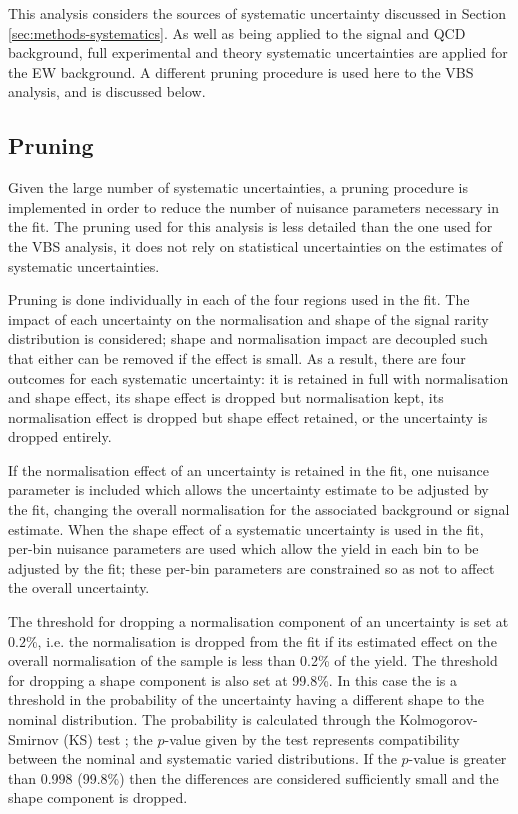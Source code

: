 

This analysis considers the sources of systematic uncertainty discussed in
Section \ref{sec:methods-systematics}. As well as being applied to the signal
and \ac{QCD} \Zy background, full experimental and theory systematic
uncertainties are applied for the \ac{EW} \Zyjj background. A different pruning
procedure is used here to the \ac{VBS} analysis, and is discussed below.


\subsection{Pruning}
Given the large number of systematic uncertainties, a pruning procedure is
implemented in order to reduce the number of nuisance parameters necessary in
the fit. The pruning used for this analysis is less detailed than the one used
for the \ac{VBS} \Zy analysis, it does not rely on statistical uncertainties on
the estimates of systematic uncertainties.

Pruning is done individually in each of the four regions used in the fit.
The impact of each uncertainty on the normalisation and shape of the signal
rarity distribution is considered; shape and normalisation impact are decoupled
such that either can be removed if the effect is small. As a result, there are
four outcomes for each systematic uncertainty: it is retained in full with
normalisation and shape effect, its shape effect is dropped but normalisation
kept, its normalisation effect is dropped but shape effect retained, or the
uncertainty is dropped entirely.

If the normalisation effect of an uncertainty is retained in the fit, one
nuisance parameter is included which allows the uncertainty estimate to be
adjusted by the fit, changing the overall normalisation for the associated
background or signal estimate. When the shape effect of a systematic uncertainty
is used in the fit, per-bin nuisance parameters are used which allow the yield
in each bin to be adjusted by the fit; these per-bin parameters are constrained
so as not to affect the overall uncertainty.

The threshold for dropping a normalisation component of an uncertainty is set at
$0.2\%$, i.e.  the normalisation is dropped from the fit if its estimated effect
on the overall normalisation of the sample is less than 0.2\% of the yield. The
threshold for dropping a shape component is also set at 99.8\%. In this case the
is a threshold in the probability of the uncertainty having a different shape
to the nominal distribution. The probability is calculated through the
Kolmogorov-Smirnov (KS) test \cite{Kolmogoroff1933,Smirnov1939,Massey1951}; the
$p$-value given by the test represents compatibility between the nominal and
systematic varied distributions. If the $p$-value is greater than 0.998 (99.8\%)
then the differences are considered sufficiently small and the shape component
is dropped.

